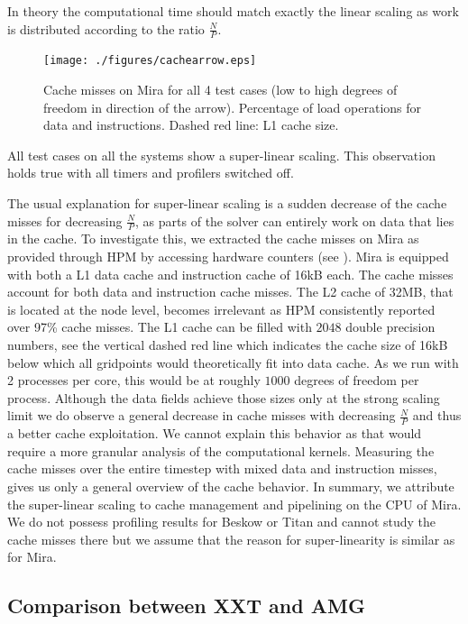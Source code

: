 \documentclass{sig-alternate}
\begin{document}
In theory the computational time should match exactly the linear scaling
as work is distributed according to the ratio $\frac{N}{P}$. 

\begin{figure}
  \centering
  \texttt{[image: ./figures/cachearrow.eps]}
  \caption{Cache misses on Mira for all 4 test cases (low to high degrees of freedom in direction of the arrow). Percentage of load operations for data and instructions. Dashed red line: L1 cache size. }
   \label{fig:cachemisses}
\end{figure}

All test cases on all the systems show a super-linear scaling. This
observation holds true with all timers and profilers switched off.

The usual explanation for super-linear scaling is a sudden decrease of the cache
misses for decreasing $\frac{N}{P}$, as parts of the solver can entirely work on data that lies in the cache. 
To investigate this, we extracted the cache misses on Mira as provided through
HPM by accessing hardware counters (see
). Mira is equipped with both a L1 data cache and
instruction cache of 16kB each. The cache misses account for both data and
instruction cache misses. The L2 cache
of 32MB, that is located at the node level, becomes irrelevant as HPM
consistently reported over 97\% cache misses. The L1 cache can be filled with $2048$ double precision
numbers, see
 the vertical dashed red line which indicates the cache 
size of 16kB below which all gridpoints would theoretically fit into data cache. As we run with 2 processes per core, this would be at roughly $1000$
degrees of freedom per process. Although the data fields achieve those sizes only at the strong scaling
limit we do observe a general decrease in cache misses with decreasing
$\frac{N}{P}$ and thus a better cache exploitation. We cannot explain this behavior as that would require a more
granular analysis of the computational kernels. Measuring the cache misses over
the entire timestep with mixed data and instruction misses, gives us only a
general overview of the cache behavior. In summary, we attribute the super-linear scaling to cache
management and pipelining on the CPU of Mira. We do not possess profiling results 
for Beskow or Titan and cannot study the cache misses there but we assume that the 
reason for super-linearity is similar as for Mira.


\subsection{Comparison between XXT and AMG}
\end{document}

